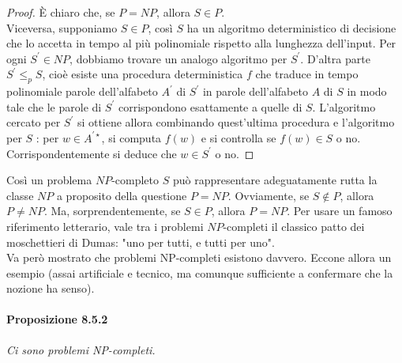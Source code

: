 \begin{proof}
    È chiaro che, se $P=N P$, allora $S \in P$.\\
    Viceversa, supponiamo $S \in P$, così $S$ ha un algoritmo deterministico di
    decisione che lo accetta in tempo al più polinomiale rispetto alla lunghezza
    dell'input. Per ogni $S^{\prime} \in N P$, dobbiamo trovare un analogo
    algoritmo per $S^{\prime}$. D'altra parte $S^{\prime} \leq_p S$, cioè esiste una
    procedura deterministica $f$ che traduce in tempo polinomiale parole
    dell'alfabeto $A^{\prime}$ di $S^{\prime}$ in parole dell'alfabeto $A$ di
    $S$ in modo tale che le parole di $S^{\prime}$ corrispondono esattamente a
    quelle di $S$. L'algoritmo cercato per $S^{\prime}$ si ottiene allora
    combinando quest'ultima procedura e l'algoritmo per $S$ : per $w \in
        A^{\prime \star}$, si computa $f(w)$ e si controlla se $f(w) \in S$ o no.
    Corrispondentemente si deduce che $w \in S^{\prime}$ o no.
\end{proof}

Così un problema $N P$-completo $S$ può rappresentare adeguatamente rutta la
classe $N P$ a proposito della questione $P=N P$. Ovviamente, se $S \notin  P$,
allora $P \neq N P$. Ma, sorprendentemente, se $S \in P$, allora $P=N P$. Per
usare un famoso riferimento letterario, vale tra i problemi $N P$-completi il
classico patto dei moschettieri di Dumas: "uno per tutti, e tutti per uno".\\
Va però mostrato che problemi NP-completi esistono davvero. Eccone allora un
esempio (assai artificiale e tecnico, ma comunque sufficiente a confermare che
la nozione ha senso).

\paragraph{Proposizione 8.5.2} \textit{Ci sono problemi NP-completi.}


